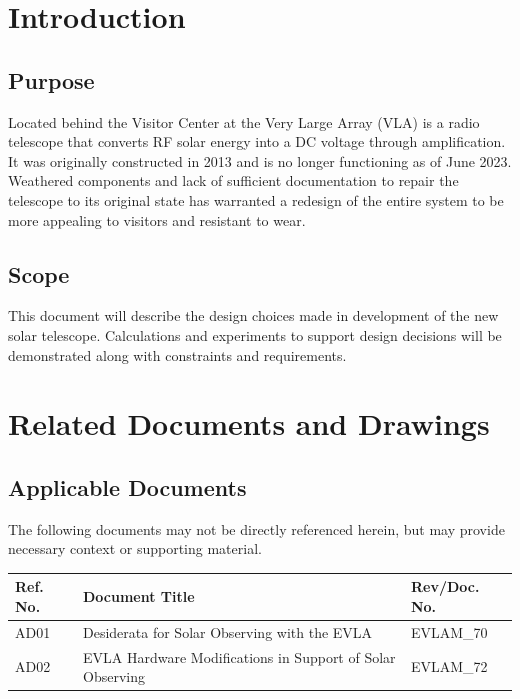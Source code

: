 \documentclass[titlepage]{article}
\begin{document}
\newpage
\tableofcontents
\listoffigures
\thispagestyle{fancy}
\newpage

\section{Introduction}

\subsection{Purpose}
Located behind the Visitor Center at the Very Large Array (VLA) is a radio telescope that converts RF solar energy into a DC voltage through amplification. It was originally constructed in 2013 and is no longer functioning as of June 2023. Weathered components and lack of sufficient documentation to repair the telescope to its original state has warranted a redesign of the entire system to be more appealing to visitors and resistant to wear.

\subsection{Scope}
This document will describe the design choices made in development of the new solar telescope. Calculations and experiments to support design decisions will be demonstrated along with constraints and requirements.


\section{Related Documents and Drawings}
\subsection{Applicable Documents}
The following documents may not be directly referenced herein, but may provide necessary context or supporting material.
\begin{center}
\begin{tabular}{|m{2cm}|m{7.5cm}|m{3.5cm}|} \hline
    \rowcolor{nraoblue}
    Ref. No. & Document Title & Rev/Doc. No.\\ \hline
    AD01 & Desiderata for Solar Observing with the EVLA & EVLAM\_70 \\ 
    \hline
    AD02 & EVLA Hardware Modifications in Support of Solar Observing & EVLAM\_72 \\
    \hline
\end{tabular}
\end{center}
\end{document}
